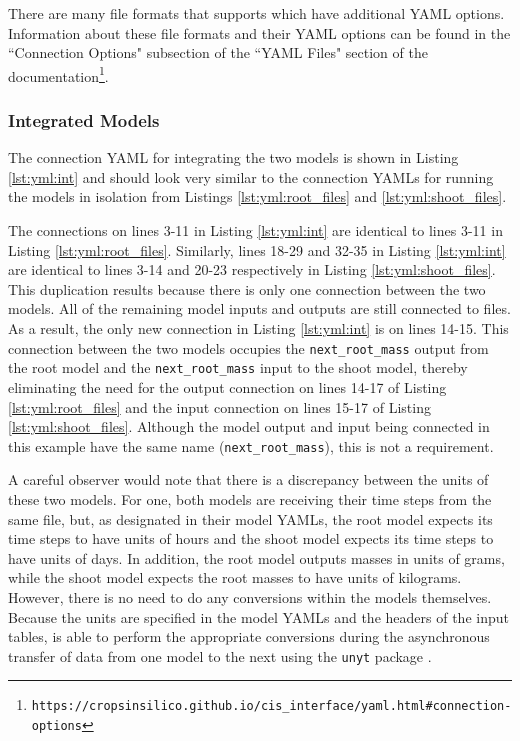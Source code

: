 \documentclass[journal]{IEEEtran}
\newcommand{\todo}[1]{{\color{red}{#1}}}
\newcommand{\pkg}{{\tt \todo{cis\_interface}}{}}
\newcommand{\intyml}{}
\begin{document}
There are many file formats that {\pkg} supports which have additional YAML options.
Information about these file formats and their YAML options can be found in the ``Connection Options" subsection of the ``YAML Files" section of the documentation\footnote{{\tt https://cropsinsilico.github.io/cis\_interface/yaml.html\#connection-options}}.

\subsubsection{Integrated Models}
%
The connection YAML for integrating the two models is shown in Listing \ref{lst:yml:int} and should look very similar to the connection YAMLs for running the models in isolation from Listings \ref{lst:yml:root_files} and \ref{lst:yml:shoot_files}. 
%
\intyml
%
The connections on lines 3-11 in Listing \ref{lst:yml:int} are identical to lines 3-11 in Listing \ref{lst:yml:root_files}. Similarly, lines 18-29 and 32-35 in Listing \ref{lst:yml:int} are identical to lines 3-14 and 20-23 respectively in Listing \ref{lst:yml:shoot_files}. This duplication results because there is only one connection between the two models. All of the remaining model inputs and outputs are still connected to files. As a result, the only new connection in Listing \ref{lst:yml:int} is on lines 14-15. This connection between the two models occupies the {\tt next\_root\_mass} output from the root model and the {\tt next\_root\_mass} input to the shoot model, thereby eliminating the need for the output connection on lines 14-17 of Listing \ref{lst:yml:root_files} and the input connection on lines 15-17 of Listing \ref{lst:yml:shoot_files}. Although the model output and input being connected in this example have the same name ({\tt next\_root\_mass}), this is not a requirement.

A careful observer would note that there is a discrepancy between the units of these two models. For one, both models are receiving their time steps from the same file, but, as designated in their model YAMLs, the root model expects its time steps to have units of hours and the shoot model expects its time steps to have units of days. In addition, the root model outputs masses in units of grams, while the shoot model expects the root masses to have units of kilograms. However, there is no need to do any conversions within the models themselves. Because the units are specified in the model YAMLs and the headers of the input tables, {\pkg} is able to perform the appropriate conversions during the asynchronous transfer of data from one model to the next using the {\tt unyt} package \citep{Goldbaum2018}. 
\end{document}
